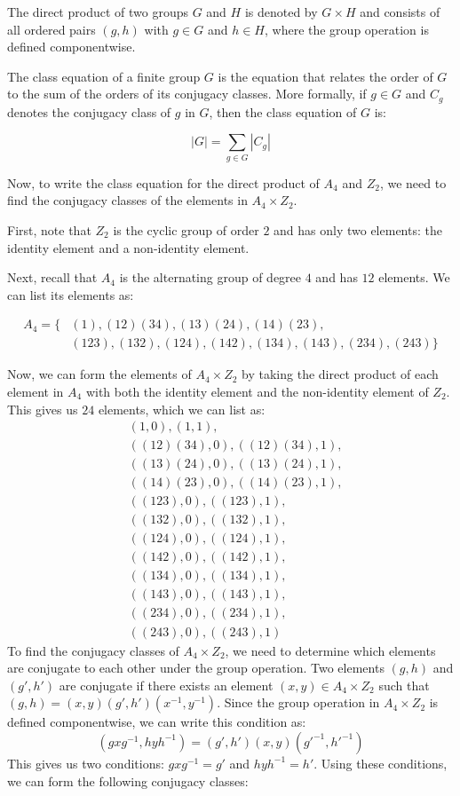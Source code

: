 \documentclass[12pt]{report}
\begin{document}
The direct product of two groups $G$ and $H$ is denoted by $G \times H$ and consists of all ordered pairs $(g,h)$ with $g \in G$ and $h \in H$, where the group operation is defined componentwise.

The class equation of a finite group $G$ is the equation that relates the order of $G$ to the sum of the orders of its conjugacy classes. More formally, if $g \in G$ and $C_g$ denotes the conjugacy class of $g$ in $G$, then the class equation of $G$ is:

$$|G| = \sum_{g \in G} |C_g|$$

Now, to write the class equation for the direct product of $A_4$ and $Z_2$, we need to find the conjugacy classes of the elements in $A_4 \times Z_2$.

First, note that $Z_2$ is the cyclic group of order $2$ and has only two elements: the identity element and a non-identity element.

Next, recall that $A_4$ is the alternating group of degree $4$ and has $12$ elements. We can list its elements as:

\begin{align*}
A_4 = \{&(1), (12)(34), (13)(24), (14)(23), \\
&(123), (132), (124), (142), (134), (143), (234), (243)\}
\end{align*}

Now, we can form the elements of $A_4 \times Z_2$ by taking the direct product of each element in $A_4$ with both the identity element and the non-identity element of $Z_2$. This gives us $24$ elements, which we can list as:
\begin{align*}
&(1,0), (1,1), \\
&((12)(34),0), ((12)(34),1), \\
&((13)(24),0), ((13)(24),1), \\
&((14)(23),0), ((14)(23),1), \\
&((123),0), ((123),1), \\
&((132),0), ((132),1), \\
&((124),0), ((124),1), \\
&((142),0), ((142),1), \\
&((134),0), ((134),1), \\
&((143),0), ((143),1), \\
&((234),0), ((234),1), \\
&((243),0), ((243),1)
\end{align*}
To find the conjugacy classes of $A_4 \times Z_2$, we need to determine which elements are conjugate to each other under the group operation. Two elements $(g,h)$ and $(g',h')$ are conjugate if there exists an element $(x,y) \in A_4 \times Z_2$ such that $(g,h) = (x,y)(g',h')(x^{-1},y^{-1})$.
Since the group operation in $A_4 \times Z_2$ is defined componentwise, we can write this condition as:
$$(gxg^{-1}, hyh^{-1}) = (g',h')(x,y)(g'^{-1},h'^{-1})$$
This gives us two conditions: $gxg^{-1} = g'$ and $hyh^{-1} = h'$.
Using these conditions, we can form the following conjugacy classes:
\end{document}
